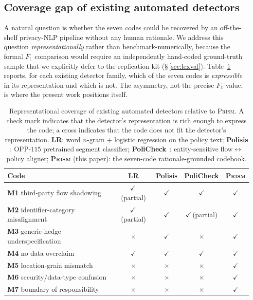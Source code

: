 \documentclass[11pt,a4paper]{article}
\newcommand{\prism}{\textsc{Prism}}
\newcommand{\code}[1]{\textsf{\textbf{#1}}}
\begin{document}
\subsection{Coverage gap of existing automated detectors}\label{sec:bench}

A natural question is whether the seven codes could be recovered by
an off-the-shelf privacy-NLP pipeline without any human rationale.
We address this question \emph{representationally} rather than
benchmark-numerically, because the formal $F_1$ comparison would
require an independently hand-coded ground-truth sample that we
explicitly defer to the replication kit (\S\,\ref{sec:lexval}).
Table~\ref{tab:coverage} reports, for each existing detector family,
which of the seven codes is \emph{expressible} in its representation
and which is not. The asymmetry, not the precise $F_1$ value, is
where the present work positions itself.

\begin{table}[t]
\centering\small
\caption{Representational coverage of existing automated detectors
relative to \prism{}. A check mark indicates that the detector's
representation is rich enough to express the code; a cross indicates
that the code does not fit the detector's representation.
\textbf{LR}: word $n$-gram + logistic regression on the policy
text; \textbf{Polisis} \citep{harkous2018polisis}: OPP-$115$ pretrained
segment classifier; \textbf{PoliCheck}~\citep{andow2020policheck}:
entity-sensitive flow$\leftrightarrow$policy aligner; \textbf{\prism{}}
(this paper): the seven-code rationale-grounded codebook.}
\label{tab:coverage}
\begin{tabular}{lcccc}
\toprule
\textbf{Code} & \textbf{LR} & \textbf{Polisis} & \textbf{PoliCheck} & \textbf{\prism{}} \\
\midrule
\code{M1} third-party flow shadowing       & $\checkmark$\,(partial) & $\checkmark$ & $\checkmark$         & $\checkmark$ \\
\code{M2} identifier-category misalignment & $\checkmark$\,(partial) & $\checkmark$ & $\checkmark$\,(partial) & $\checkmark$ \\
\code{M3} generic-hedge underspecification & $\times$    & $\checkmark$ & $\times$    & $\checkmark$ \\
\code{M4} no-data overclaim                & $\checkmark$ & $\checkmark$ & $\checkmark$ & $\checkmark$ \\
\code{M5} location-grain mismatch          & $\times$    & $\times$    & $\times$    & $\checkmark$ \\
\code{M6} security/data-type confusion     & $\times$    & $\times$    & $\times$    & $\checkmark$ \\
\code{M7} boundary-of-responsibility       & $\times$    & $\times$    & $\times$    & $\checkmark$ \\
\bottomrule
\end{tabular}
\end{table}
\end{document}
